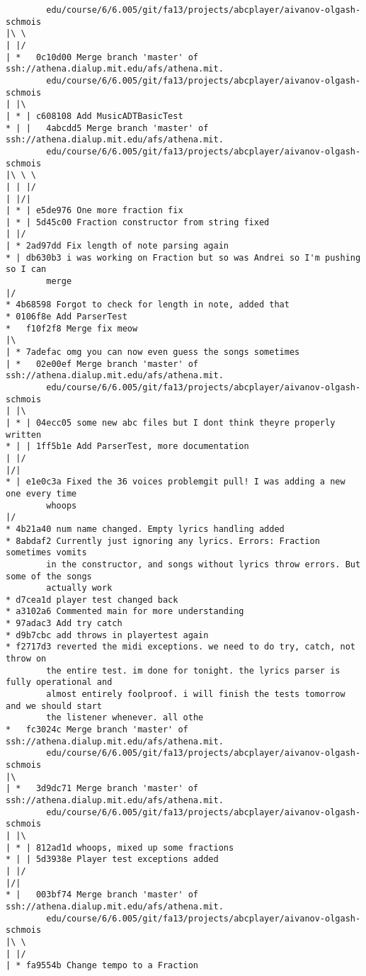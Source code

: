 \documentclass[12pt]{book}
\begin{document}
\begin{Verbatim}
        edu/course/6/6.005/git/fa13/projects/abcplayer/aivanov-olgash-schmois
|\ \
| |/
| *   0c10d00 Merge branch 'master' of ssh://athena.dialup.mit.edu/afs/athena.mit.
        edu/course/6/6.005/git/fa13/projects/abcplayer/aivanov-olgash-schmois
| |\
| * | c608108 Add MusicADTBasicTest
* | |   4abcdd5 Merge branch 'master' of ssh://athena.dialup.mit.edu/afs/athena.mit.
        edu/course/6/6.005/git/fa13/projects/abcplayer/aivanov-olgash-schmois
|\ \ \
| | |/
| |/|
| * | e5de976 One more fraction fix
| * | 5d45c00 Fraction constructor from string fixed
| |/
| * 2ad97dd Fix length of note parsing again
* | db630b3 i was working on Fraction but so was Andrei so I'm pushing so I can 
        merge
|/
* 4b68598 Forgot to check for length in note, added that
* 0106f8e Add ParserTest
*   f10f2f8 Merge fix meow
|\
| * 7adefac omg you can now even guess the songs sometimes
| *   02e00ef Merge branch 'master' of ssh://athena.dialup.mit.edu/afs/athena.mit.
        edu/course/6/6.005/git/fa13/projects/abcplayer/aivanov-olgash-schmois
| |\
| * | 04ecc05 some new abc files but I dont think theyre properly written
* | | 1ff5b1e Add ParserTest, more documentation
| |/
|/|
* | e1e0c3a Fixed the 36 voices problemgit pull! I was adding a new one every time 
        whoops
|/
* 4b21a40 num name changed. Empty lyrics handling added
* 8abdaf2 Currently just ignoring any lyrics. Errors: Fraction sometimes vomits 
        in the constructor, and songs without lyrics throw errors. But some of the songs 
        actually work
* d7cea1d player test changed back
* a3102a6 Commented main for more understanding
* 97adac3 Add try catch
* d9b7cbc add throws in playertest again
* f2717d3 reverted the midi exceptions. we need to do try, catch, not throw on 
        the entire test. im done for tonight. the lyrics parser is fully operational and 
        almost entirely foolproof. i will finish the tests tomorrow and we should start 
        the listener whenever. all othe
*   fc3024c Merge branch 'master' of ssh://athena.dialup.mit.edu/afs/athena.mit.
        edu/course/6/6.005/git/fa13/projects/abcplayer/aivanov-olgash-schmois
|\
| *   3d9dc71 Merge branch 'master' of ssh://athena.dialup.mit.edu/afs/athena.mit.
        edu/course/6/6.005/git/fa13/projects/abcplayer/aivanov-olgash-schmois
| |\
| * | 812ad1d whoops, mixed up some fractions
* | | 5d3938e Player test exceptions added
| |/
|/|
* |   003bf74 Merge branch 'master' of ssh://athena.dialup.mit.edu/afs/athena.mit.
        edu/course/6/6.005/git/fa13/projects/abcplayer/aivanov-olgash-schmois
|\ \
| |/
| * fa9554b Change tempo to a Fraction

\end{Verbatim}
\end{document}
